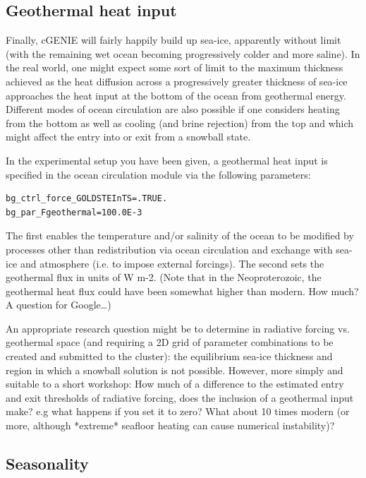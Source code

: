 \documentclass[11pt,fleqn]{book} %
\begin{document}

\subsection{Geothermal heat input}

Finally, cGENIE will fairly happily build up sea-ice, apparently without limit (with the remaining wet ocean becoming progressively colder and more saline). In the real world, one might expect some sort of limit to the maximum thickness achieved as the heat diffusion across a progressively greater thickness of sea-ice approaches the heat input at the bottom of the ocean from geothermal energy. Different modes of ocean circulation are also possible if one considers heating from the bottom as well as cooling (and brine rejection) from the top and which might affect the entry into or exit from a snowball state.

In the experimental setup you have been given, a geothermal heat input is specified in the ocean circulation module via the following parameters:

\begin{verbatim}
bg_ctrl_force_GOLDSTEInTS=.TRUE.
bg_par_Fgeothermal=100.0E-3
\end{verbatim}

The first enables the temperature and/or salinity of the ocean to be modified by processes other than redistribution via ocean circulation and exchange with sea-ice and atmosphere (i.e. to impose external forcings). The second sets the geothermal flux in units of W m-2. (Note that in the Neoproterozoic, the geothermal heat flux could have been somewhat higher than modern. How much? A question for Google…)

An appropriate research question might be to determine in radiative forcing vs. geothermal space (and requiring a 2D grid of parameter combinations to be created and submitted to the cluster): the equilibrium sea-ice thickness and region in which a snowball solution is not possible. However, more simply and suitable to a short workshop: How much of a difference to the estimated entry and exit thresholds of radiative forcing, does the inclusion of a geothermal input make? e.g what happens if you set it to zero? What about 10 times modern (or more, although *extreme* seafloor heating can cause numerical instability)?


\subsection{Seasonality}
\end{document}
